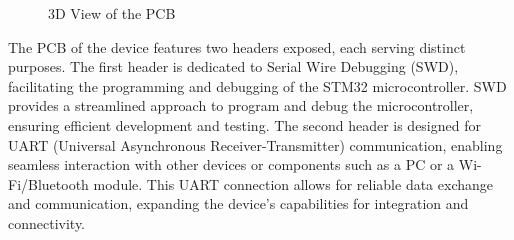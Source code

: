 \documentclass[a4paper, twoside]{report}
\begin{document}
 \begin{figure}[H]
    \centering
    \qquad
    \caption{3D View of the PCB}
\end{figure}

The PCB of the device features two headers exposed, each serving distinct purposes. The first header is dedicated to Serial Wire Debugging (SWD), facilitating the programming and debugging of the STM32 microcontroller. SWD provides a streamlined approach to program and debug the microcontroller, ensuring efficient development and testing. The second header is designed for UART (Universal Asynchronous Receiver-Transmitter) communication, enabling seamless interaction with other devices or components such as a PC or a Wi-Fi/Bluetooth module. This UART connection allows for reliable data exchange and communication, expanding the device's capabilities for integration and connectivity.
\end{document}
